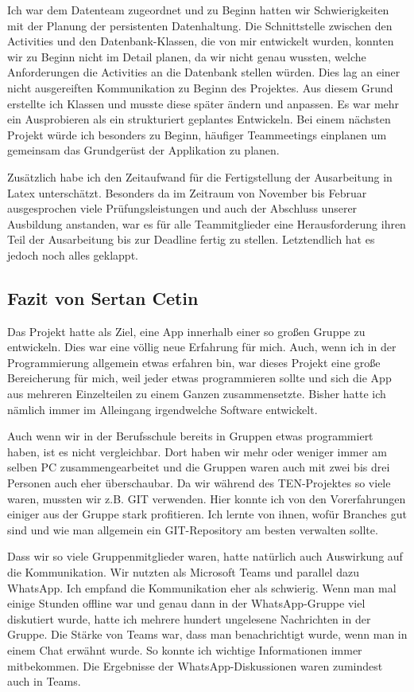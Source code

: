 Ich war dem Datenteam zugeordnet und zu Beginn hatten wir Schwierigkeiten mit der Planung der persistenten Datenhaltung. Die Schnittstelle zwischen den Activities und den Datenbank-Klassen, die von mir entwickelt wurden, konnten wir zu Beginn nicht im Detail planen, da wir nicht genau wussten, welche Anforderungen die Activities an die Datenbank stellen würden. Dies lag an einer nicht ausgereiften Kommunikation zu Beginn des Projektes. Aus diesem Grund erstellte ich Klassen und musste diese später ändern und anpassen. Es war mehr ein Ausprobieren als ein strukturiert geplantes Entwickeln. Bei einem nächsten Projekt würde ich besonders zu Beginn, häufiger Teammeetings einplanen um gemeinsam das Grundgerüst der Applikation zu planen.

Zusätzlich habe ich den Zeitaufwand für die Fertigstellung der Ausarbeitung in Latex unterschätzt. Besonders da im Zeitraum von November bis Februar ausgesprochen viele Prüfungsleistungen und auch der Abschluss unserer Ausbildung anstanden, war es für alle Teammitglieder eine Herausforderung ihren Teil der Ausarbeitung bis zur Deadline fertig zu stellen. Letztendlich hat es jedoch noch alles geklappt.


\subsection{Fazit von Sertan Cetin}

Das Projekt hatte als Ziel, eine App innerhalb einer so großen Gruppe zu entwickeln. Dies war eine völlig neue Erfahrung für mich. Auch, wenn ich in der Programmierung allgemein etwas erfahren bin, war dieses Projekt eine große Bereicherung für mich, weil jeder etwas programmieren sollte und sich die App aus mehreren Einzelteilen zu einem Ganzen zusammensetzte. Bisher hatte ich nämlich immer im Alleingang irgendwelche Software entwickelt.

Auch wenn wir in der Berufsschule bereits in Gruppen etwas programmiert haben, ist es nicht vergleichbar. Dort haben wir mehr oder weniger immer am selben PC zusammengearbeitet und die Gruppen waren auch mit zwei bis drei Personen auch eher überschaubar. Da wir während des TEN-Projektes so viele waren, mussten wir z.B. GIT verwenden. Hier konnte ich von den Vorerfahrungen einiger aus der Gruppe stark profitieren. Ich lernte von ihnen, wofür Branches gut sind und wie man allgemein ein GIT-Repository am besten verwalten sollte.

Dass wir so viele Gruppenmitglieder waren, hatte natürlich auch Auswirkung auf die Kommunikation. Wir nutzten als Microsoft Teams und parallel dazu WhatsApp. Ich empfand die Kommunikation eher als schwierig. Wenn man mal einige Stunden offline war und genau dann in der WhatsApp-Gruppe viel diskutiert wurde, hatte ich mehrere hundert ungelesene Nachrichten in der Gruppe. Die Stärke von Teams war, dass man benachrichtigt wurde, wenn man in einem Chat erwähnt wurde. So konnte ich wichtige Informationen immer mitbekommen. Die Ergebnisse der WhatsApp-Diskussionen waren zumindest auch in Teams.

